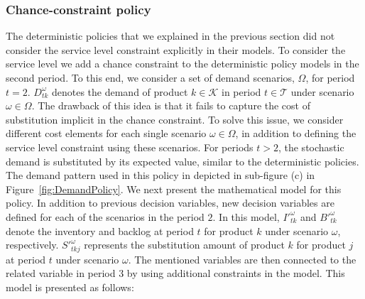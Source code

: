 \documentclass[10pt]{article}
\newcommand{\ti}{t} %
\newcommand{\TI}{\mathcal{T}}
\newcommand{\ka}{k} %
\newcommand{\KA}{\mathcal{K}}
\newcommand{\jey}{j} %
\newcommand{\Es}{S} %
\newcommand{\m}{\omega} %
\newcommand{\EM}{\Omega} %
\begin{document}
\subsubsection{Chance-constraint policy}

The deterministic policies that we explained in the previous section did not consider the service level constraint explicitly in their models. To consider the service level we add a chance constraint to the deterministic policy models in the second period. To this end, we consider a set of demand scenarios, $\EM$, for period $\ti =2$. $D^{\m}_{\ti\ka}$ denotes the demand of product $\ka \in \KA$ in period $\ti \in \TI$ under scenario $\m \in \EM$. The drawback of this idea is that it fails to capture the cost of substitution implicit in the chance constraint. To solve this issue, we consider different cost elements for each single scenario $\m \in \EM$, in addition to defining the service level constraint using these scenarios. 
For periods $\ti > 2$, the stochastic demand is substituted by its expected value, similar to the deterministic policies. The demand pattern used in this policy in depicted in sub-figure (c) in Figure~\ref{fig:DemandPolicy}. 
We next present the mathematical model for this policy. In addition to previous decision variables, new decision variables are defined for each of the scenarios in the period $2$. In this model, $I'^{\m}_{\ti \ka }$ and $B'^{\m}_{\ti \ka}$ denote the inventory and backlog at period $\ti$  for product $\ka$ under scenario $\m$, respectively. $\Es'^{\m}_{\ti \ka \jey}$ represents the substitution amount of product $\ka$ for product $\jey$ at period $\ti$ under scenario $\m$. The mentioned variables are then connected to the related variable in period 3 by using additional constraints in the model. This model is presented as follows:
\end{document}
